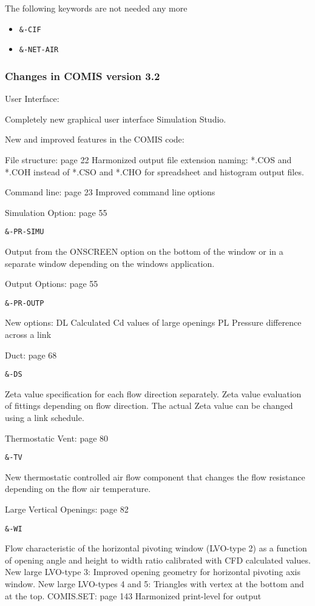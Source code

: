 \documentclass[10pt]{article}
\begin{document}
The following keywords are not needed any more

\begin{itemize}
\item\verb|&-CIF|
\item\verb|&-NET-AIR|
\end{itemize}

\subsubsection{Changes in COMIS version 3.2}

User Interface:

Completely new graphical user interface Simulation Studio.


New and improved features in the COMIS code:

File structure: page 22 Harmonized output file extension naming: *.COS and *.COH instead of *.CSO and *.CHO for spreadsheet and histogram output files.

Command line: page 23 Improved command line options

Simulation Option: page 55

\verb|&-PR-SIMU|

Output from the ONSCREEN option on the bottom of the window or in a separate window depending on the windows application.

Output Options: page 55

\verb|&-PR-OUTP|

New options: 
DL Calculated Cd values of large openings 
PL Pressure difference across a link 


Duct: page 68

\verb|&-DS|

Zeta value specification for each flow direction separately. 
Zeta value evaluation of fittings depending on flow direction. 
The actual Zeta value can be changed using a link schedule. 


Thermostatic Vent: page 80

\verb|&-TV|

New thermostatic controlled air flow component that changes the flow resistance depending on the flow air temperature.

Large Vertical Openings: page 82

\verb|&-WI|

Flow characteristic of the horizontal pivoting window (LVO-type 2) as a function of opening angle and height to width ratio calibrated with CFD calculated values. New large LVO-type 3: Improved opening geometry for horizontal pivoting axis window. New large LVO-types 4 and 5: Triangles with vertex at the bottom and at the top. COMIS.SET: page 143 Harmonized print-level for output
\end{document}
